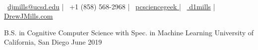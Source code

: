 \documentclass[]{awesome-cv}
\begin{document}
\begin{center}
	  \\
	\vspace{2mm}
	{\faEnvelopeO\ \href{mailto:djmills@ucsd.edu}{djmills@ucsd.edu}} | {\faMobile\ +1 (858) 568-2968} | {\faGithub\ \href{https://github.com/pcsciencegeek}{pcsciencegeek }}|  {\faLinkedinSquare\ \href{https://linkedin.com/in/d1mills/}{ d1mills}} | {\faInternetExplorer \href{http://drewmills.co.uk/}{ DrewJMills.com}}
\end{center}
\begin{cventries}
	\cventry
	{B.S. in Cognitive Computer Science with Spec. in Machine Learning}
	{University of California, San Diego} 
	{}
	{June 2019}
	{}
\end{cventries}
\end{document}
